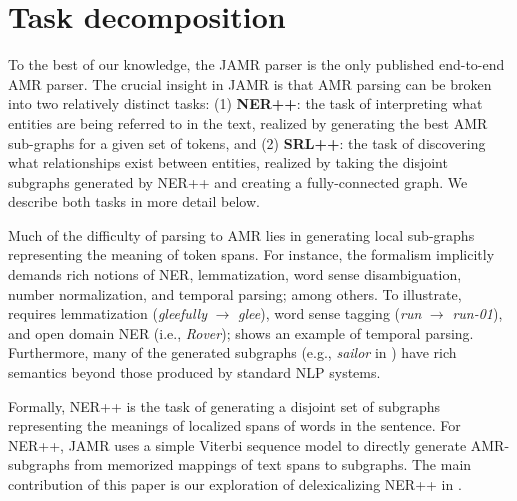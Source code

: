 \documentclass[11pt]{article}
\begin{document}
\section{Task decomposition}



To the best of our knowledge, the JAMR parser \cite{2014flanigan-amr} is
the only published end-to-end AMR parser.
The crucial insight in JAMR is that AMR parsing can be broken into two 
relatively distinct tasks: (1) \textbf{NER++}: the task of interpreting what entities are being referred to in 
the text, realized by generating the best AMR sub-graphs for a given set of tokens, and
(2) \textbf{SRL++}: the task of discovering what 
relationships exist between entities, realized by taking the disjoint subgraphs generated
  by NER++ and creating a fully-connected graph.
We describe both tasks in more detail below.


Much of the difficulty of parsing to AMR lies in generating local sub-graphs representing the meaning of token spans.
For instance, the formalism implicitly demands rich notions of NER, lemmatization, word sense disambiguation, number normalization, and temporal parsing; among others.
To illustrate,  requires lemmatization (\textit{gleefully} $\rightarrow$ \textit{glee}), word sense tagging (\textit{run} $\rightarrow$ \textit{run-01}), and open domain NER (i.e., \textit{Rover});  shows an example of temporal parsing.
Furthermore, many of the generated subgraphs (e.g., \textit{sailor} in ) have rich semantics beyond those produced by standard NLP systems.

Formally, NER++ is the task of generating a disjoint set of subgraphs representing the meanings of localized spans of words in the sentence.
For NER++, JAMR uses a simple Viterbi sequence model to directly generate AMR-subgraphs from memorized mappings of text spans to subgraphs. The main contribution of this paper is our exploration of delexicalizing NER++ in .
\end{document}
